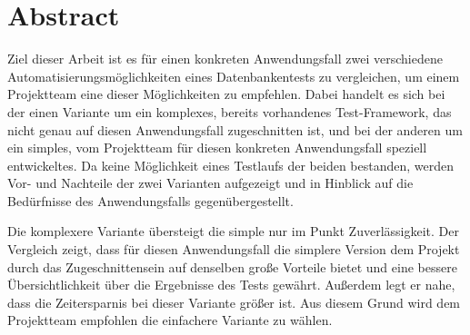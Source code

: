 \chapter*{Abstract}

Ziel dieser Arbeit ist es für einen konkreten Anwendungsfall zwei verschiedene Automatisierungsmöglichkeiten eines Datenbankentests zu vergleichen, um einem Projektteam eine dieser Möglichkeiten zu empfehlen. Dabei handelt es sich bei der einen Variante um ein komplexes, bereits vorhandenes Test-Framework, das nicht genau auf diesen Anwendungsfall zugeschnitten ist, und bei der anderen um ein simples, vom Projektteam für diesen konkreten Anwendungsfall speziell entwickeltes. Da keine Möglichkeit eines Testlaufs der beiden bestanden, werden Vor- und Nachteile der zwei Varianten aufgezeigt und in Hinblick auf die Bedürfnisse des Anwendungsfalls gegenübergestellt. 
\newline

Die komplexere Variante übersteigt die simple nur im Punkt Zuverlässigkeit. Der Vergleich zeigt, dass für diesen Anwendungsfall die simplere Version dem Projekt durch das Zugeschnittensein auf denselben große Vorteile bietet und eine bessere Übersichtlichkeit über die Ergebnisse des Tests gewährt. Außerdem legt er nahe, dass die Zeitersparnis bei dieser Variante größer ist. Aus diesem Grund wird dem Projektteam empfohlen die einfachere Variante zu wählen.

